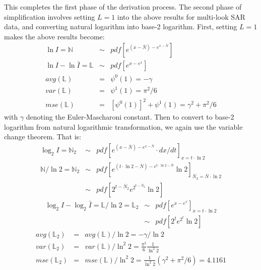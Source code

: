 \documentclass[journal]{IEEEtran}
\begin{document}
This completes the first phase of the derivation process.
The second phase of simplification involves setting $L=1$ into the above results for multi-look SAR data,
  and converting natural logarithm into base-2 logarithm.
First, setting $L=1$ makes the above results become:
\begin{eqnarray*}
   \ln{I} = \mathbb{N} &\sim&  pdf \left[ e^{(x-\bar{N})-e^{x-\bar{N}}} \right] \\
   \ln{I} - \ln{\bar{I}} = \mathbb{L} &\sim& pdf \left[ e^{x-e^x}  \right] \\ 
    avg(\mathbb{L}) &=& \psi^0(1) = -\gamma \\
    var(\mathbb{L}) &=& \psi^1(1) = \pi^2 / 6 \\  
    mse(\mathbb{L}) &=& \left[ \psi^0(1) \right]^2 + \psi^1(1) = \gamma^2 + \pi^2 / 6
\end{eqnarray*}
with $\gamma$ denoting the Euler-Mascharoni constant.
Then to convert to base-2 logarithm from natural logarithmic transformation,
  we again use the variable change theorem.
  That is:
  \begin{eqnarray*}
   \log_2{I}  = \mathbb{N}_2    &\sim&  pdf \left[ e^{(x-\bar{N})-e^{x-\bar{N}}} \cdot dx/dt \right]_{x=t\cdot \ln{2}} \\
   \mathbb{N} / \ln{2} = \mathbb{N}_2 &\sim&  pdf \left[ e^{(t\cdot \ln{2}-\bar{N})-e^{t\cdot \ln{2}-\bar{N}}} \ln{2} \right]_{\bar{N}_2 = \bar{N} \cdot \ln{2}} \\
       &\sim&  pdf \left[ 2^{t-\bar{N}_2}e^{2^{t-\bar{N}_2}} \ln{2} \right] 
  \end{eqnarray*}
\begin{eqnarray*}
   \log_2{I} - \log_2{\bar{I}} = \mathbb{L} / \ln{2} = \mathbb{L}_2 &\sim& pdf \left[ e^{x-e^x}  \right]_{x=t \cdot \ln{2}} \\  
       &\sim& pdf \left[ 2^t e^{2^t} \ln{2}  \right] 
\end{eqnarray*}
\begin{eqnarray*}
  avg(\mathbb{L}_2) &=& avg(\mathbb{L})/ \ln{2} = -\gamma / \ln{2} \\
  var(\mathbb{L}_2) &=& var(\mathbb{L})/ \ln^2{2} = \frac{\pi^2}{6} \frac{1}{ \ln^2{2}} \\
  mse(\mathbb{L}_2) &=& mse(\mathbb{L})/ \ln^2{2} = \frac{1}{\ln^2{2}}( \gamma^2 + \pi^2/6 ) = 4.1161 
\end{eqnarray*}
\end{document}

